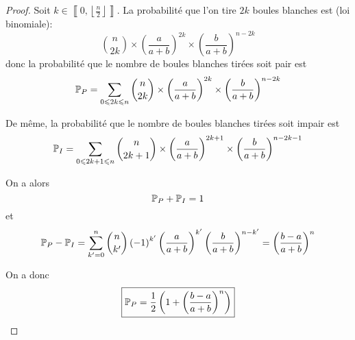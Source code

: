 \begin{proof}
    Soit $k\in\left\llbracket0,\left\lfloor\frac{n}{2}\right\rfloor\right\rrbracket$. La probabilité que l'on tire $2k$ boules blanches est (loi binomiale):
    \begin{equation}
        \binom{n}{2k}\times\left(\frac{a}{a+b}\right)^{2k}\times\left(\frac{b}{a+b}\right)^{n-2k}
    \end{equation}
    donc la probabilité que le nombre de boules blanches tirées soit pair est 
    \begin{equation}
        \P_{P}=\sum_{0\leqslant 2k\leqslant n}\binom{n}{2k}\times\left(\frac{a}{a+b}\right)^{2k}\times\left(\frac{b}{a+b}\right)^{n-2k}
    \end{equation}
    
    De même, la probabilité que le nombre de boules blanches tirées soit impair est 
    \begin{equation}
        \P_{I}=\sum_{0\leqslant 2k+1\leqslant n}\binom{n}{2k+1}\times\left(\frac{a}{a+b}\right)^{2k+1}\times\left(\frac{b}{a+b}\right)^{n-2k-1}
    \end{equation}

    On a alors 
    \begin{equation}
        \P_{P}+\P_{I}=1
    \end{equation}
    et 
    \begin{equation}
        \P_{P}-\P_{I}=\sum_{k'=0}^{n}\binom{n}{k'}\left(-1\right)^{k'}\left(\frac{a}{a+b}\right)^{k'}\left(\frac{b}{a+b}\right)^{n-k'}=\left(\frac{b-a}{a+b}\right)^{n}
    \end{equation}

    On a donc 
    \begin{equation}
        \boxed{\P_{P}=\frac{1}{2}\left(1+\left(\frac{b-a}{a+b}\right)^{n}\right)}
    \end{equation}
\end{proof}

